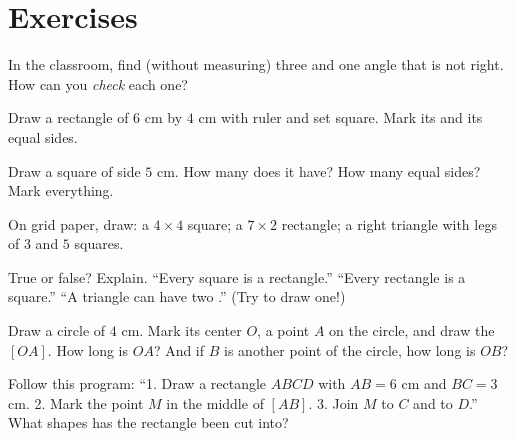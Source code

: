 \section{Exercises}

\begin{exercise}[$\star$]\label{exo:g3:shapes:1}
In the classroom, find (without measuring) three  and
one angle that is not right. How can you \emph{check} each one?
\end{exercise}

\begin{exercise}[$\star$]\label{exo:g3:shapes:2}
Draw a rectangle of $6$ cm by $4$ cm with ruler and set square. Mark
its  and its equal sides.
\end{exercise}

\begin{exercise}[$\star$]\label{exo:g3:shapes:3}
Draw a square of side $5$ cm. How many  does it have?
How many equal sides? Mark everything.
\end{exercise}

\begin{exercise}[$\star$]\label{exo:g3:shapes:4}
On grid paper, draw: a $4 \times 4$ square; a $7 \times 2$
rectangle; a right triangle with legs of $3$ and $5$ squares.
\end{exercise}

\begin{exercise}[$\star$]\label{exo:g3:shapes:5}
True or false? Explain.
``Every square is a rectangle.'' \quad
``Every rectangle is a square.'' \quad
``A triangle can have two .'' (Try to draw one!)
\end{exercise}

\begin{exercise}[$\star$]\label{exo:g3:shapes:6}
Draw a circle of  $4$ cm. Mark its center $O$, a point $A$ on
the circle, and draw the  $[OA]$. How long is $OA$? And if $B$
is another point of the circle, how long is $OB$?
\end{exercise}

\begin{exercise}[$\star$]\label{exo:g3:shapes:7}
Follow this program: ``1. Draw a rectangle $ABCD$ with $AB = 6$ cm
and $BC = 3$ cm. 2. Mark the point $M$ in the middle of $[AB]$.
3. Join $M$ to $C$ and to $D$.'' What shapes has the rectangle been
cut into?
\end{exercise}

